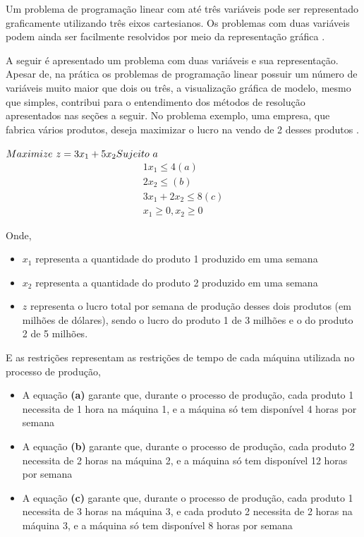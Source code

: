 Um problema de programação linear com até três variáveis pode ser representado graficamente utilizando três eixos cartesianos. Os problemas com duas variáveis podem ainda ser facilmente resolvidos por meio da representação gráfica \cite{Passos}. 

A seguir é apresentado um problema com duas variáveis e sua representação. Apesar de, na prática os problemas de programação linear possuir um número de variáveis muito maior que dois ou três, a visualização gráfica de modelo, mesmo que simples, contribui para o entendimento dos métodos de resolução apresentados nas seções a seguir.
No problema exemplo, uma empresa, que fabrica vários produtos, deseja maximizar o lucro na vendo de 2 desses produtos \cite{Hillier}.

$\\Maximize\ z=3x_{1}+5x_{2}\\
Sujeito\ a\\$
\begin{eqnarray*}
        1x_{1}\leq 4 (a)\\
              2x_{2}\leq (b)\\
        3x_{1}+2x_{2}\leq 8 (c)\\
         x_{1}\geq 0, x_{2}\geq 0
\end{eqnarray*}

Onde, 
\begin{itemize}
\item \textbf {$x_{1}$} representa a quantidade do produto 1 produzido em uma semana
\item \textbf {$x_{2}$} representa a quantidade do produto 2 produzido em uma semana
\item \textbf {$z$} representa o lucro total por semana de produção desses dois produtos (em milhões de dólares), sendo o lucro do produto 1 de 3 milhões e o do produto 2 de 5 milhões.
\end{itemize}

E as restrições representam as restrições de tempo de cada máquina utilizada no processo de produção,
\begin{itemize}
\item A equação \textbf {(a)} garante que, durante o processo de produção, cada produto 1 necessita de 1 hora na máquina 1, e a máquina só tem disponível 4 horas por semana
\item A equação \textbf {(b)} garante que, durante o processo de produção, cada produto 2 necessita de 2 horas na máquina 2, e a máquina só tem disponível 12 horas por semana
\item A equação \textbf {(c)} garante que, durante o processo de produção, cada produto 1 necessita de 3 horas na máquina 3, e cada produto 2 necessita de 2 horas na máquina 3, e a máquina só tem disponível 8 horas por semana
\end{itemize}

